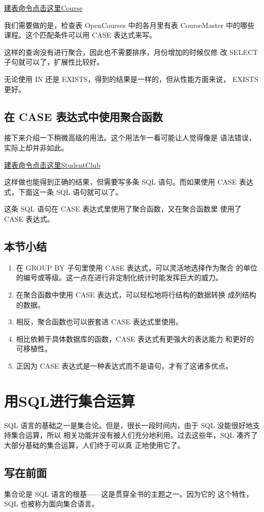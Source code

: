 \href{}{建表命令点击这里Course}

我们需要做的是，检查表 OpenCourses 中的各月里有表 CourseMaster
中的哪些课程。这个匹配条件可以用 CASE 表达式来写。


这样的查询没有进行聚合，因此也不需要排序，月份增加的时候仅修
改 SELECT 子句就可以了，扩展性比较好。

无论使用 IN 还是 EXISTS，得到的结果是一样的，但从性能方面来说，
EXISTS 更好。

\subsection{在 CASE 表达式中使用聚合函数}
接下来介绍一下稍微高级的用法。这个用法乍一看可能让人觉得像是
语法错误，实际上却并非如此。

\href{}{建表命令点击这里StudentClub}


这样做也能得到正确的结果，但需要写多条 SQL 语句。而如果使用
CASE 表达式，下面这一条 SQL 语句就可以了。


这条 SQL 语句在 CASE 表达式里使用了聚合函数，又在聚合函数里
使用了 CASE 表达式。

\subsection{本节小结}
\begin{enumerate}
      \item 在 GROUP BY 子句里使用 CASE 表达式，可以灵活地选择作为聚合
            的单位的编号或等级。这一点在进行非定制化统计时能发挥巨大的威力。
      \item 在聚合函数中使用 CASE 表达式，可以轻松地将行结构的数据转换
            成列结构的数据。
      \item 相反，聚合函数也可以嵌套进 CASE 表达式里使用。
      \item 相比依赖于具体数据库的函数，CASE 表达式有更强大的表达能力
            和更好的可移植性。
      \item 正因为 CASE 表达式是一种表达式而不是语句，才有了这诸多优点。
\end{enumerate}

\section{用SQL进行集合运算}
SQL 语言的基础之一是集合论。但是，很长一段时间内，由于 SQL 没能很好地支持集合运算，所以
相关功能并没有被人们充分地利用。过去这些年，SQL 凑齐了大部分基础的集合运算，人们终于可以真
正地使用它了。
\subsection{写在前面}
集合论是 SQL 语言的根基——这是贯穿全书的主题之一。因为它的
这个特性，SQL 也被称为面向集合语言。

